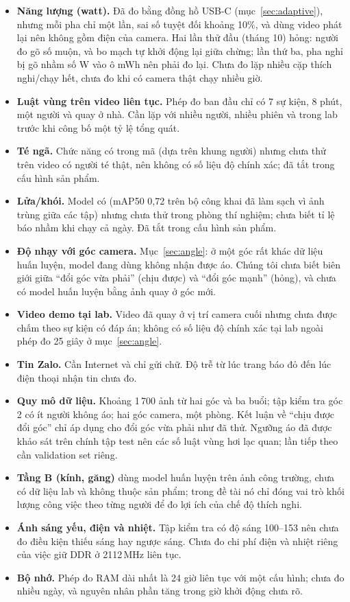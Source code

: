 \documentclass[12pt,a4paper]{article}
\begin{document}
\begin{itemize}
  \item \textbf{Năng lượng (watt).} Đã đo bằng đồng hồ USB-C (mục~\ref{sec:adaptive}), nhưng mỗi pha chỉ một lần, sai số tuyệt đối
        khoảng 10\%, và dùng video phát lại nên không gồm điện của camera. Hai lần thử đầu (tháng 10) hỏng: người đo gõ số muộn,
        và bo mạch tự khởi động lại giữa chừng; lần thứ ba, pha nghỉ bị gõ nhầm số W vào ô mWh nên phải đo lại. Chưa đo lặp nhiều cặp
        thích nghi/chạy hết, chưa đo khi có camera thật chạy nhiều giờ.
  \item \textbf{Luật vùng trên video liên tục.} Phép đo ban đầu chỉ có 7 sự kiện, 8 phút, một người và quay ở nhà.
        Cần lặp với nhiều người, nhiều phiên và trong lab trước khi công bố một tỷ lệ tổng quát.
  \item \textbf{Té ngã.} Chức năng có trong mã (dựa trên khung người) nhưng chưa thử trên video có người té thật,
        nên không có số liệu độ chính xác; đã tắt trong cấu hình sản phẩm.
  \item \textbf{Lửa/khói.} Model có (mAP50 0,72 trên bộ công khai đã làm sạch vì ảnh trùng giữa các tập) nhưng chưa thử
        trong phòng thí nghiệm; chưa biết tỉ lệ báo nhầm khi chạy cả ngày. Đã tắt trong cấu hình sản phẩm.
  \item \textbf{Độ nhạy với góc camera.} Mục~\ref{sec:angle}: ở một góc rất khác dữ liệu huấn luyện, model đang dùng không nhận được áo. Chúng tôi chưa biết
        biên giới giữa ``đổi góc vừa phải'' (chịu được) và ``đổi góc mạnh'' (hỏng), và chưa có model huấn luyện bằng ảnh quay ở góc mới.
  \item \textbf{Video demo tại lab.} Video đã quay ở vị trí camera cuối nhưng chưa được chấm theo sự kiện có đáp án; không có số liệu độ chính xác tại lab ngoài
        phép đo 25 giây ở mục~\ref{sec:angle}.
  \item \textbf{Tin Zalo.} Cần Internet và chỉ gửi chữ. Độ trễ từ lúc trang báo đỏ đến lúc điện thoại nhận tin chưa đo.
  \item \textbf{Quy mô dữ liệu.} Khoảng 1\,700 ảnh từ hai góc và ba buổi; tập kiểm tra góc 2 có ít người không áo; hai
        góc camera, một phòng. Kết luận về ``chịu được đổi góc'' chỉ áp dụng cho đổi góc vừa phải như đã thử. Ngưỡng
        áo đã được khảo sát trên chính tập test nên các số luật vùng hơi lạc quan; lần tiếp theo cần validation set riêng.
  \item \textbf{Tầng B (kính, găng)} dùng model huấn luyện trên ảnh công trường, chưa có dữ liệu lab và không thuộc sản
        phẩm; trong đề tài nó chỉ đóng vai trò khối lượng công việc theo từng người để đo lợi ích của chế độ thích nghi.
  \item \textbf{Ánh sáng yếu, điện và nhiệt.} Tập kiểm tra có độ sáng 100--153 nên chưa đo điều kiện thiếu sáng hay ngược sáng. Chưa đo chi phí điện và nhiệt riêng của việc giữ DDR ở 2112\,MHz liên tục.
  \item \textbf{Bộ nhớ.} Phép đo RAM dài nhất là 24 giờ liên tục với một cấu hình; chưa đo nhiều ngày, và nguyên nhân phần tăng trong giờ khởi động chưa rõ.
\end{itemize}
\end{document}

